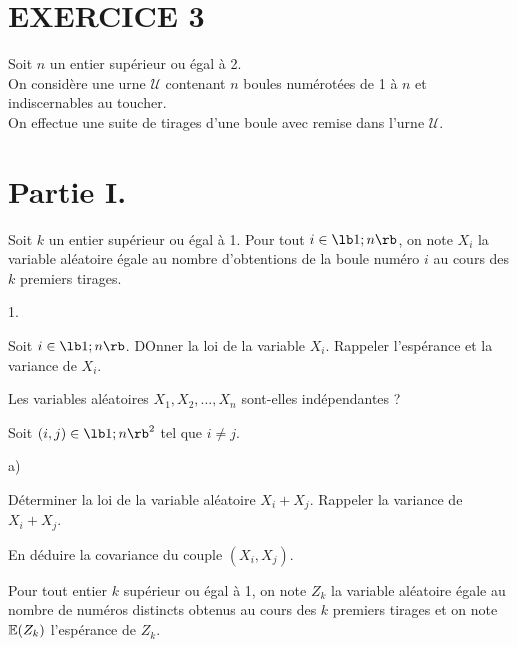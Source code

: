 \documentclass[11pt]{article}%
\begin{document}
\section*{EXERCICE 3}
\noindent Soit $n$ un entier supérieur ou égal à 2. \\
On considère une urne $\mathcal{U}$ contenant $n$ boules numérotées de
1 à $n$ et indiscernables au toucher. \\
On effectue une suite de tirages d'une boule avec remise dans l'urne
$\mathcal{U}$.

\section*{Partie I.}
\noindent Soit $k$ un entier supérieur ou égal à 1. Pour tout $i \in
\lb 1 ; n \rb$, on note $X_{i}$ la variable aléatoire égale au nombre
d'obtentions de la boule numéro $i$ au cours des $k$ premiers tirages. 

\begin{noliste}{1.}
 \setlength{\itemsep}{4mm}

\item Soit $i \in \lb 1 ; n \rb$. DOnner la loi de la variable $X_{i}$.
Rappeler l'espérance et la variance de $X_{i}$. \\

\item Les variables aléatoires $X_{1},X_{2}, \dots, X_{n}$ sont-elles
indépendantes ? \\

\item Soit $(i,j) \in \lb 1 ; n \rb^{2}$ tel que $i \neq j$.

\begin{noliste}{a)}
 \setlength{\itemsep}{2mm}

\item Déterminer la loi de la variable aléatoire $X_{i} + X_{j}$.
Rappeler la variance de $X_{i} + X_{j}$. \\

\item En déduire la covariance du couple $(X_{i},X_{j})$. \\

\end{noliste}

\end{noliste}

\noindent Pour tout entier $k$ supérieur ou égal à 1, on note $Z_{k}$
la variable aléatoire égale au nombre de numéros distincts obtenus au
cours des $k$ premiers tirages et on note $\mathbb{E}(Z_{k})$ l'espérance de
$Z_{k}$.
\end{document}
